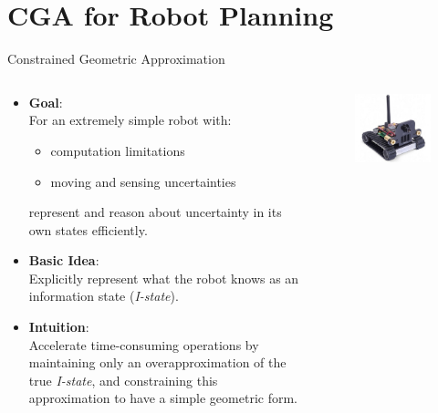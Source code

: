 \section{CGA for Robot Planning}
\begin{frame}{Constrained Geometric Approximation}
\begin{columns}
  \begin{column}{.65\textwidth}
    \begin{itemize}
    \item \textbf{Goal}:\\
    For an extremely simple robot with:
    \begin{itemize}
    \item computation limitations
    \item moving and sensing uncertainties
    \end{itemize}
    represent and reason about uncertainty in its own states efficiently.\\
    \item \textbf{Basic Idea}:\\
    Explicitly represent what the robot knows as an information state (\textit{I-state}).
    \item \textbf{Intuition}:\\
    Accelerate time-consuming operations by maintaining only an \textcolor[rgb]{1.00,0.00,0.00}{overapproximation} of the true
    \emph{I-state}, and constraining this approximation
    to have a simple geometric form.\\
    \end{itemize}
  \end{column}
  \begin{column}{.35\textwidth}
    \begin{figure}
    \includegraphics[scale=0.2]{figs/srvq.jpg}

\end{figure}
\end{column}
\end{columns}
\end{frame}
